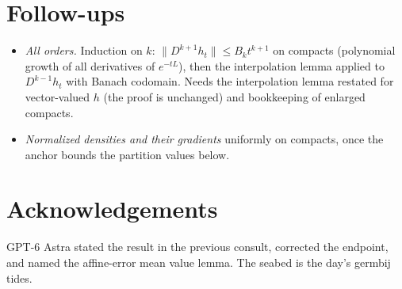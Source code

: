 \documentclass[11pt]{article}
\begin{document}
\section{Follow-ups}

\begin{itemize}
\item \emph{All orders.} Induction on $k$: $\|D^{k+1}h_t\| \le B_k
t^{k+1}$ on compacts (polynomial growth of all derivatives of
$e^{-tL}$), then the interpolation lemma applied to $D^{k-1}h_t$ with
Banach codomain. Needs the interpolation lemma restated for
vector-valued $h$ (the proof is unchanged) and bookkeeping of enlarged
compacts.
\item \emph{Normalized densities and their gradients} uniformly on
compacts, once the anchor bounds the partition values below.
\end{itemize}

\section*{Acknowledgements}

GPT-6 Astra stated the result in the previous consult, corrected the
endpoint, and named the affine-error mean value lemma. The seabed is
the day's germbij tides.
\end{document}
